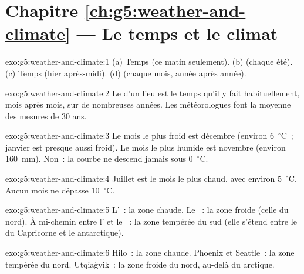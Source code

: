 \section*{Chapitre \ref{ch:g5:weather-and-climate} --- Le temps et le climat}

\begin{solution}{exo:g5:weather-and-climate:1}
(a) Temps (ce matin seulement). (b)  (chaque été). (c) Temps (hier
après-midi). (d)  (chaque mois, année après année).
\end{solution}

\begin{solution}{exo:g5:weather-and-climate:2}
Le  d'un lieu est le temps qu'il y fait habituellement, mois après
mois, sur de nombreuses années. Les météorologues font la moyenne des
mesures de 30 ans.
\end{solution}

\begin{solution}{exo:g5:weather-and-climate:3}
Le mois le plus froid est décembre (environ 6~$^\circ$C~; janvier est
presque aussi froid). Le mois le plus humide est novembre (environ
160~mm). Non~: la courbe ne descend jamais sous 0~$^\circ$C.
\end{solution}

\begin{solution}{exo:g5:weather-and-climate:4}
Juillet est le mois le plus chaud, avec environ 5~$^\circ$C. Aucun mois ne
dépasse 10~$^\circ$C.
\end{solution}

\begin{solution}{exo:g5:weather-and-climate:5}
L'~: la zone chaude. Le ~: la zone froide (celle du nord).
À mi-chemin entre l' et le ~: la zone tempérée du sud
(elle s'étend entre le  du Capricorne et le 
antarctique).
\end{solution}

\begin{solution}{exo:g5:weather-and-climate:6}
Hilo~: la zone chaude. Phoenix et Seattle~: la zone tempérée du nord.
Utqiaġvik~: la zone froide du nord, au-delà du  arctique.
\end{solution}

